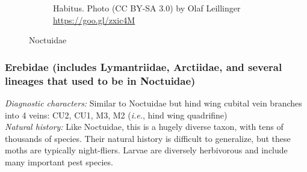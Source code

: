 \documentclass[letterpaper, 11pt]{article}
\begin{document}
\begin{figure}[ht!]
\begin{subfigure}[ht!]{0.37\textwidth}
        \caption{Habitus. Photo (CC BY-SA 3.0) by Olaf Leillinger \url{https://goo.gl/zxic4M}}
        \label{fig:noctuid2}
    \end{subfigure}
    \caption{Noctuidae}\label{fig:noctuids}
\end{figure}

\subsubsection{Erebidae (includes Lymantriidae, Arctiidae, and several lineages that used to be in Noctuidae)}
\noindent{}\textit{Diagnostic characters:} Similar to Noctuidae but hind wing cubital vein branches into 4 veins: CU2, CU1, M3, M2 (\textit{i.e.}, hind wing quadrifine)\\

\noindent{}\textit{Natural history:} Like Noctuidae, this is a hugely diverse taxon, with tens of thousands of species. Their natural history is difficult to generalize, but these moths are typically night-fliers. Larvae are diversely herbivorous and include many important pest species.
\end{document}
